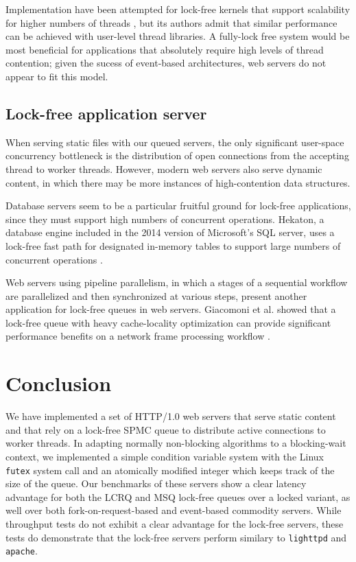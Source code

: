 \documentclass[twoside,10pt]{article}
\begin{document}
\begin{multicols}{2}
Implementation have been attempted for lock-free kernels that support
scalability for higher numbers of threads \cite{massalin1992lock}, but
its authors admit that similar performance can be achieved with
user-level thread libraries. A fully-lock free system would be most
beneficial for applications that absolutely require high levels of
thread contention; given the sucess of event-based architectures, web
servers do not appear to fit this model.

\subsection{Lock-free application server}

When serving static files with our queued servers, the only
significant user-space concurrency bottleneck is the distribution of
open connections from the accepting thread to worker threads. However,
modern web servers also serve dynamic content, in which there may be
more instances of high-contention data structures.

Database servers seem to be a particular fruitful ground for lock-free
applications, since they must support high numbers of concurrent
operations. Hekaton, a database engine included in the 2014 version of
Microsoft's SQL server, uses a lock-free fast path for designated
in-memory tables to support large numbers of concurrent operations
\cite{diaconu2013hekaton}.

Web servers using pipeline parallelism, in which a stages of a
sequential workflow are parallelized and then synchronized at various
steps, present another application for lock-free queues in web
servers. Giacomoni et al. showed that a lock-free queue with heavy
cache-locality optimization can provide significant performance
benefits on a network frame processing workflow
\cite{giacomoni2008fastforward}.

\section{Conclusion}

We have implemented a set of HTTP/1.0 web servers that serve static
content and that rely on a lock-free SPMC queue to distribute active
connections to worker threads. In adapting normally non-blocking
algorithms to a blocking-wait context, we implemented a simple
condition variable system with the Linux \verb+futex+ system call and
an atomically modified integer which keeps track of the size of the
queue. Our benchmarks of these servers show a clear latency advantage
for both the LCRQ and MSQ lock-free queues over a locked variant, as
well over both fork-on-request-based and event-based commodity
servers. While throughput tests do not exhibit a clear advantage for
the lock-free servers, these tests do demonstrate that the lock-free
servers perform similary to \verb+lighttpd+ and \verb+apache+.


\end{multicols}
\end{document}

